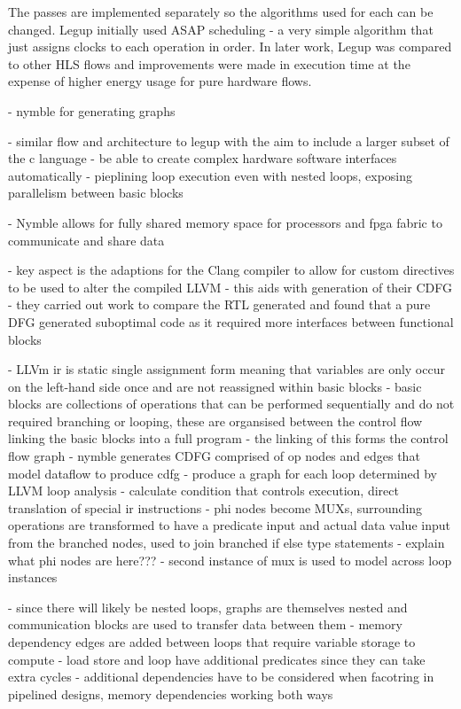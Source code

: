 The passes are implemented separately so the algorithms used for each can be changed. Legup initially used ASAP scheduling - a very simple algorithm that just assigns clocks to each operation in order. In later work, Legup was compared to other HLS flows and improvements were made in execution time at the expense of higher energy usage for pure hardware flows.

\iffalse
- nymble for generating graphs

- similar flow and architecture to legup with the aim to include a larger subset of the c language
- be able to create complex hardware software interfaces automatically
- pieplining loop execution even with nested loops, exposing parallelism between basic blocks

- Nymble allows for fully shared memory space for processors and fpga fabric to communicate and share data

- key aspect is the adaptions for the Clang compiler to allow for custom directives to be used to alter the compiled LLVM
- this aids with generation of their CDFG
- they carried out work to compare the RTL generated and found that a pure DFG generated suboptimal code as it required more interfaces between functional blocks

- LLVm ir is static single assignment form meaning that variables are only occur on the left-hand side once and are not reassigned within basic blocks
- basic blocks are collections of operations that can be performed sequentially and do not required branching or looping, these are organsised between the control flow linking the basic blocks into a full program
- the linking of this forms the control flow graph
- nymble generates CDFG comprised of op nodes and edges that model dataflow to produce cdfg
- produce a graph for each loop determined by LLVM loop analysis
- calculate condition that controls execution, direct translation of special ir instructions
- phi nodes become MUXs, surrounding operations are transformed to have a predicate input and actual data value input from the branched nodes, used to join branched if else type statements
- explain what phi nodes are here???
- second instance of mux is used to model across loop instances

- since there will likely be nested loops, graphs are themselves nested and communication blocks are used to transfer data between them
- memory dependency edges are added between loops that require variable storage to compute
- load store and loop have additional predicates since they can take extra cycles 
- additional dependencies have to be considered when facotring in pipelined designs, memory dependencies working both ways

